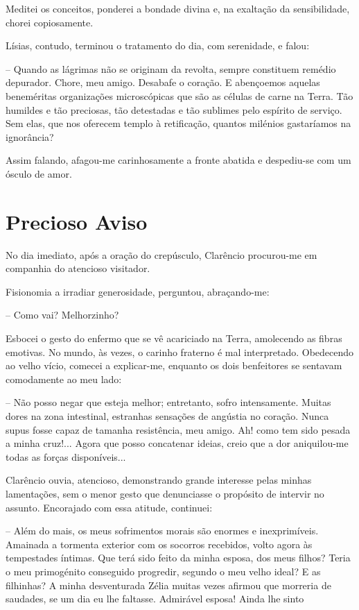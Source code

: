 \documentclass[portuguese,12pt,a4paper]{scrbook}
\begin{document}
	Meditei os conceitos, ponderei a bondade divina e, na exaltação da sensibilidade, chorei copiosamente.
	
	Lísias, contudo, terminou o tratamento do dia, com serenidade, e falou:
	
	– Quando as lágrimas não se originam da revolta, sempre constituem remédio depurador. Chore, meu amigo. Desabafe o coração. E abençoemos aquelas beneméritas organizações microscópicas que são as células de carne na Terra. Tão humildes e tão preciosas, tão detestadas e tão sublimes pelo espírito de serviço. Sem elas, que nos oferecem templo à retificação, quantos milénios gastaríamos na ignorância?
	
	
	Assim falando, afagou-me carinhosamente a fronte abatida e despediu-se com um ósculo de amor.
	
	
	\chapter{Precioso Aviso}
	
	No dia imediato, após a oração do crepúsculo, Clarêncio procurou-me em companhia do atencioso visitador.
	
	Fisionomia a irradiar generosidade, perguntou, abraçando-me:
	
	– Como vai? Melhorzinho?
	
	Esbocei o gesto do enfermo que se vê acariciado na Terra, amolecendo as fibras emotivas. No mundo, às vezes, o carinho fraterno é mal interpretado. Obedecendo ao velho vício, comecei a explicar-me, enquanto os dois benfeitores se sentavam comodamente ao meu lado:
	
	– Não posso negar que esteja melhor; entretanto, sofro intensamente. Muitas dores na zona intestinal, estranhas sensações de angústia no coração. Nunca supus fosse capaz de tamanha resistência, meu amigo. Ah! como tem sido pesada a minha cruz!... Agora que posso concatenar ideias, creio que a dor aniquilou-me todas as forças disponíveis...
	
	Clarêncio ouvia, atencioso, demonstrando grande interesse pelas minhas lamentações, sem o menor gesto que denunciasse o propósito de intervir no assunto. Encorajado com essa atitude, continuei:
	
	– Além do mais, os meus sofrimentos morais são enormes e inexprimíveis. Amainada a tormenta exterior com os socorros recebidos, volto agora às tempestades íntimas. Que terá sido feito da minha esposa, dos meus filhos? Teria o meu primogénito conseguido progredir, segundo o meu velho ideal? E as filhinhas? A minha desventurada Zélia muitas vezes afirmou que morreria de saudades, se um dia eu lhe faltasse. Admirável esposa! Ainda lhe sinto
	
\end{document}
